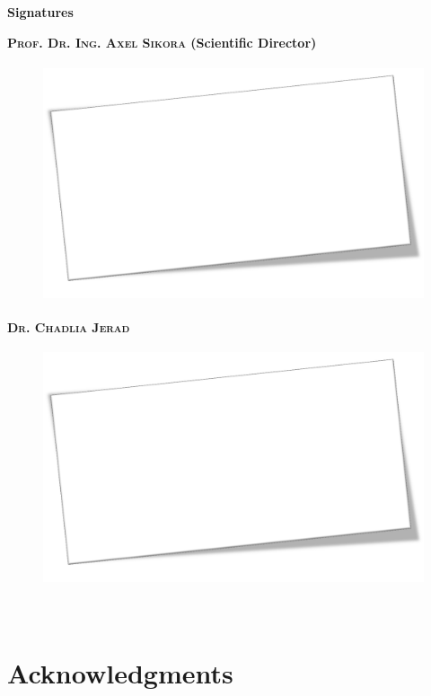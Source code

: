 \chapter*{}
{  \Huge  \textbf{Signatures} }\newline

\begin{center}
\textbf{P\textsc{rof}. D\textsc{r.} I\textsc{ng.} A\textsc{xel} S\textsc{ikora} (Scientific Director)}\\
\begin{figure}[H]
\centering
\includegraphics[height=7cm]{figures/titlepage_fig/signature.jpg}
\label{fig:Signature1}
\end{figure}
\textbf{D\textsc{r.} C\textsc{hadlia} J\textsc{erad}}
\begin{figure}[H]
\centering
\includegraphics[height=7cm]{figures/titlepage_fig/signature.jpg}
\label{fig:Signature1}
\end{figure}
\\

\end{center}
\newpage

\chapter*{Acknowledgments}
\label{cha:authors}

